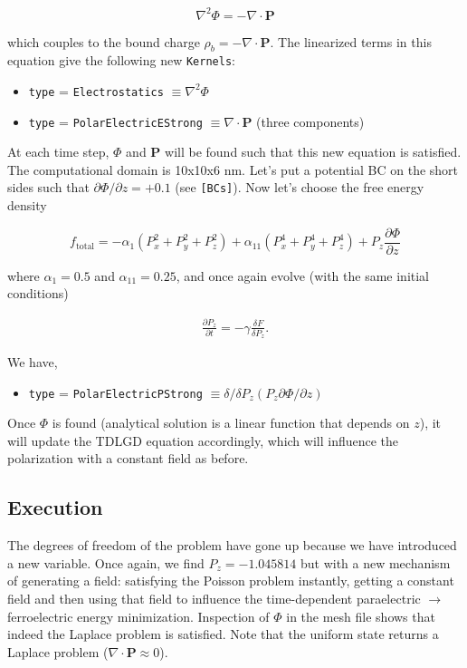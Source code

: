 \documentclass[paper=a4, fontsize=14pt]{scrartcl} %
\numberwithin{equation}{section} %
\numberwithin{figure}{section} %
\numberwithin{table}{section} %
\begin{document}
$$\nabla^2 \Phi = - \nabla \cdot \textbf{P}$$

which couples to the bound charge $\rho_b = - \nabla \cdot \textbf{P}$. The linearized terms in this equation give the following new \texttt{Kernels}:

\begin{itemize}
\item \texttt{type} = \texttt{Electrostatics} $\equiv \nabla^2 \Phi$
\item \texttt{type} = \texttt{PolarElectricEStrong} $\equiv \nabla \cdot \textbf{P}$ (three components)
\end{itemize}


At each time step, $\Phi$ and $\textbf{P}$ will be found such that this new equation is satisfied. The computational domain is 10x10x6 nm. Let's put a potential BC on the short sides such that $\partial \Phi / \partial z = +0.1$ (see \texttt{[BCs]}). Now let's choose the free energy density

$$f_\mathrm{total} = - \alpha_1 \left(P_x^2 + P_y^2 + P_z^2 \right) + \alpha_{11} \left(P_x^4 + P_y^4 + P_z^4 \right) + P_z \frac{\partial \Phi}{\partial z} $$

where $\alpha_1 = 0.5$ and $\alpha_{11} = 0.25$, and once again evolve (with the same initial conditions) 

\begin{align}\nonumber
\frac{\partial P_z}{\partial t} = - \gamma \frac{\delta F}{\delta P_z}.
\end{align}

We have, 

\vspace{-10pt}

\begin{itemize}
\item \texttt{type} = \texttt{PolarElectricPStrong} $\equiv \delta /\delta P_z \left( P_z \partial \Phi / \partial z \right)$
\end{itemize}

Once $\Phi$ is found (analytical solution is a linear function that depends on $z$), it will update the TDLGD equation accordingly, which will influence the polarization with a constant field as before. 

\subsection*{Execution}

The degrees of freedom of the problem have gone up because we have introduced a new variable. Once again, we find $P_z = -1.045814$ but with a new mechanism of generating a field: satisfying the Poisson problem instantly, getting a constant field and then using that field to influence the time-dependent paraelectric $\to$ ferroelectric energy minimization. Inspection of $\Phi$ in the mesh file shows that indeed the Laplace problem is satisfied. Note that the uniform state returns a Laplace problem ($\nabla \cdot \textbf{P} \approx 0$).
\end{document}
